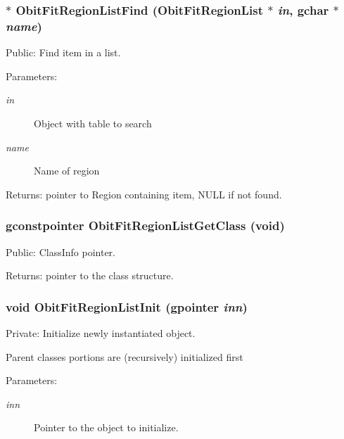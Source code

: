 \subsubsection{$\ast$ Obit\-Fit\-Region\-List\-Find ({\bf Obit\-Fit\-Region\-List} $\ast$ {\em in}, gchar $\ast$ {\em name})}\label{ObitFitRegionList_8c_a12}


Public: Find item in a list. 

\begin{Desc}
\item[Parameters:]
\begin{description}
\item[{\em in}]Object with table to search \item[{\em name}]Name of region \end{description}
\end{Desc}
\begin{Desc}
\item[Returns:]pointer to Region containing item, NULL if not found. \end{Desc}
\subsubsection{\setlength{\rightskip}{0pt plus 5cm}gconstpointer Obit\-Fit\-Region\-List\-Get\-Class (void)}\label{ObitFitRegionList_8c_a7}


Public: Class\-Info pointer. 

\begin{Desc}
\item[Returns:]pointer to the class structure. \end{Desc}
\subsubsection{\setlength{\rightskip}{0pt plus 5cm}void Obit\-Fit\-Region\-List\-Init (gpointer {\em inn})}\label{ObitFitRegionList_8c_a3}


Private: Initialize newly instantiated object. 

Parent classes portions are (recursively) initialized first \begin{Desc}
\item[Parameters:]
\begin{description}
\item[{\em inn}]Pointer to the object to initialize. \end{description}
\end{Desc}
